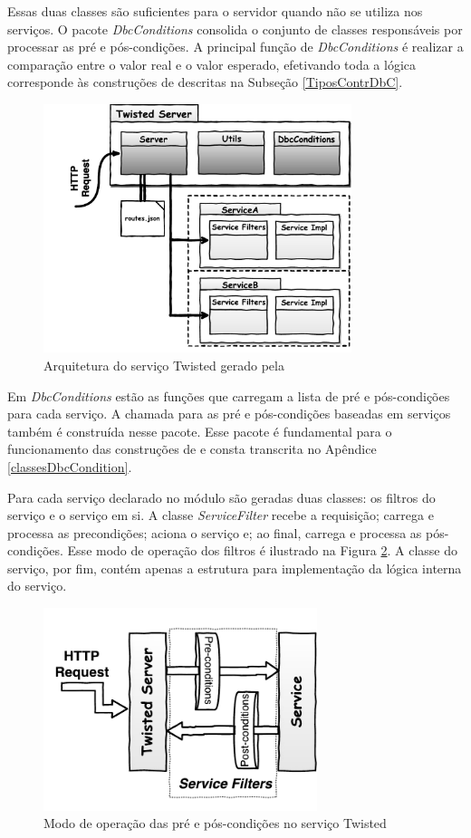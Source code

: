 Essas duas classes são suficientes para o servidor quando não se utiliza
\designbycontract{} nos serviços. O pacote
\emph{DbcConditions} consolida o conjunto de classes res\-pon\-sá\-veis por
processar as pré e pós-condições. A principal função de \emph{DbcConditions} é realizar a
comparação entre o valor real e o valor esperado, efetivando toda a
lógica corresponde às construções de \designbycontract{} descritas na Subseção
\ref{TiposContrDbC}.

\begin{figure}[htb]
\centering
\includegraphics[width=90mm,trim = 18mm 4mm 0mm
0mm,clip]{img/TwistedServer.pdf}
\caption{Arquitetura do serviço Twisted gerado pela \neoidl{}}
\label{Fig:TwistedArchtecture}
\end{figure}

Em \emph{DbcConditions} estão as funções que carregam a lista de pré e
pós-condições para cada serviço. A chamada para as pré e pós-condições baseadas
em serviços também é construída nesse pacote. Esse pacote é fundamental para o
funcionamento das cons\-tru\-ções de \designbycontract{} e consta transcrita no
Apêndice \ref{classesDbcCondition}.

Para cada serviço declarado no módulo \neoidl{} são geradas duas classes: os
filtros do serviço e o serviço em si. A classe \emph{ServiceFilter} recebe a
requisição; carrega e processa as precondições; aciona o serviço e; ao final,
carrega e processa as pós-condições. Esse modo de operação dos filtros é
ilustrado na Figura \ref{Fig:TwistedFiltes}. A classe do serviço, por
fim, contém apenas a estrutura para implementação da lógica interna do serviço.

\begin{figure}[!htb]
\centering
\includegraphics[width=80mm,trim = 5mm 6mm 0mm 
3mm,clip]{img/TwistedFilters.pdf}
\caption{Modo de operação das pré e pós-condições no serviço Twisted}
\label{Fig:TwistedFiltes}
\end{figure}



